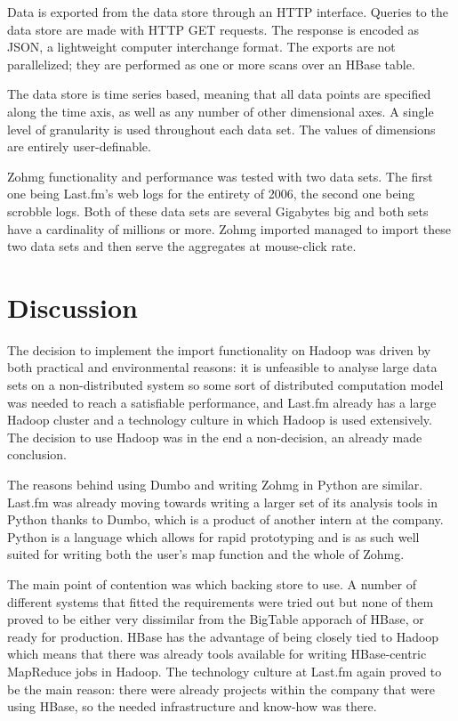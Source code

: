 Data is exported from the data store through an HTTP interface. Queries to the
data store are made with HTTP GET requests. The response is encoded as JSON, a
lightweight computer interchange format. The exports are not parallelized; they
are performed as one or more scans over an HBase table.

The data store is time series based, meaning that all data points are specified
along the time axis, as well as any number of other dimensional axes. A single
level of granularity is used throughout each data set. The values of dimensions
are entirely user-definable.

Zohmg functionality and performance was tested with two data sets. The first one
being Last.fm's web logs for the entirety of 2006, the second one being scrobble
logs. Both of these data sets are several Gigabytes big and both sets have a
cardinality of millions or more. Zohmg imported managed to import these two data
sets and then serve the aggregates at mouse-click rate.


\section{Discussion}


The decision to implement the import functionality on Hadoop was driven by both
practical and environmental reasons: it is unfeasible to analyse large data sets
on a non-distributed system so some sort of distributed computation model was
needed to reach a satisfiable performance, and Last.fm already has a large
Hadoop cluster and a technology culture in which Hadoop is used extensively. The
decision to use Hadoop was in the end a non-decision, an already made
conclusion.

The reasons behind using Dumbo and writing Zohmg in Python are similar. Last.fm
was already moving towards writing a larger set of its analysis tools in Python
thanks to Dumbo, which is a product of another intern at the company. Python is
a language which allows for rapid prototyping and is as such well suited for
writing both the user's map function and the whole of Zohmg.

The main point of contention was which backing store to use. A number of
different systems that fitted the requirements were tried out but none of them
proved to be either very dissimilar from the BigTable apporach of HBase, or
ready for production. HBase has the advantage of being closely tied to
Hadoop which means that there was already tools available for writing
HBase-centric MapReduce jobs in Hadoop. The technology culture at Last.fm again
proved to be the main reason: there were already projects within the company
that were using HBase, so the needed infrastructure and know-how was there.

